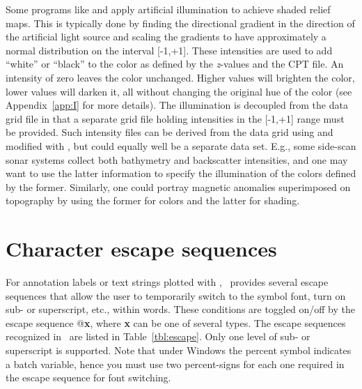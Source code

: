 Some programs like  and  apply artificial
illumination to achieve shaded relief maps.  This is typically done
by finding the directional gradient in the direction of the artificial
light source and scaling the gradients to have approximately a normal
distribution on the interval [-1,+1].  These intensities are used
to add ``white'' or ``black'' to the color as defined by the \emph{z}-values
and the CPT file.  An intensity of zero leaves the color unchanged.
Higher values will brighten the color, lower values will darken it,
all without changing the original hue of the color (see Appendix~\ref{app:I}
for more details).  The illumination is decoupled from the data
grid file in that a separate grid file holding intensities in the
[-1,+1] range must be provided.  Such intensity files can be
derived from the data grid using  and modified
with , but could equally well be a separate data set.
E.g., some side-scan sonar systems collect both bathymetry and
backscatter intensities, and one may want to use the latter information
to specify the illumination of the colors defined by the former.
Similarly, one could portray magnetic anomalies superimposed on
topography by using the former for colors and the latter for shading. 

\section{Character escape sequences}
\label{sec:escape}

For annotation labels or text strings plotted with ,
\GMT\ provides several escape sequences that allow the user to
temporarily switch to the symbol font, turn on sub- or superscript,
etc., within words.  These conditions are toggled on/off by the
escape sequence @\textbf{x}, where \textbf{x} can be one of several types.
The escape sequences recognized in \GMT\ are listed in Table~\ref{tbl:escape}. 
Only one level of sub- or superscript is supported.
Note that under Windows the percent symbol indicates a batch variable,
hence you must use two percent-signs for each one required in the escape sequence for font switching.

